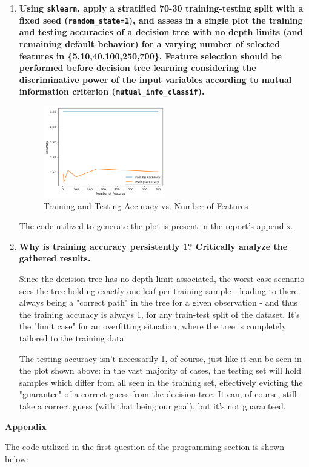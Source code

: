 \documentclass[12pt]{article}
\begin{document}
\begin{enumerate}[leftmargin=\labelsep,resume]
  \item \textbf{Using \texttt{sklearn}, apply a stratified 70-30 training-testing split with a fixed seed (\texttt{random\_state=1}), and assess in a single plot the training and testing accuracies of a decision tree with no depth limits (and remaining default behavior) for a varying number of selected features in \{5,10,40,100,250,700\}. Feature selection should be performed before decision tree learning considering the discriminative power of the input variables according to mutual information criterion (\texttt{mutual\_info\_classif}).}

        \begin{figure}[H]
          \centering
          \includegraphics[width=0.5\textwidth]{../assets/hw1-2.1.png}
          \caption{Training and Testing Accuracy vs. Number of Features}
        \end{figure}

        The code utilized to generate the plot is present in the report's appendix.

  \item \textbf{Why is training accuracy persistently 1? Critically analyze the gathered results.}

        Since the decision tree has no depth-limit associated, the worst-case scenario sees the tree
        holding exactly one leaf per training sample - leading to there always being a "correct path" in the tree for a given observation - and thus the training accuracy is always 1, for any train-test split of the dataset.
        It's the "limit case" for an overfitting situation, where the tree is completely tailored to the training data.

        The testing accuracy isn't necessarily 1, of course, just like it can be seen in the plot shown above: in the vast majority of cases, the testing set will hold samples which differ from all seen in the training set, effectively evicting the "guarantee" of a correct guess from the decision tree. It can, of course, still take a correct guess (with that being our goal), but it's not guaranteed.

\end{enumerate}

\pagebreak

\large{\textbf{Appendix}\vskip 0.3cm}

The code utilized in the first question of the programming section is shown below:


\end{document}
